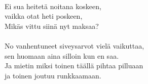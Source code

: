\hspace{10mm} \\
            Ei sua heitetä noitana koskeen,  \\
            vaikka otat heti poskeen,  \\
            Mikäs vittu siinä nyt maksaa? \\
\hspace{10mm} \\
            No vanhentuneet siveysarvot vielä vaikuttaa,  \\
            sen huomaan aina silloin kun en saa. \\
            Ja mietin miksi toinen täällä pihtaa pilluaan  \\
            ja toinen joutuu runkkaamaan. \\
